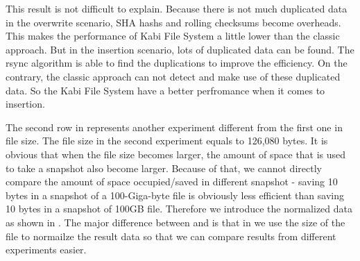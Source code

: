     This result is not difficult to explain. Because there is not much duplicated data in the overwrite scenario, SHA hashs and rolling checksums become overheads. This makes the performance of Kabi File System a little lower than the classic approach. But in the insertion scenario, lots of duplicated data can be found. The rsync algorithm is able to find the duplications to improve the efficiency. On the contrary, the classic approach can not detect and make use of these duplicated data. So the Kabi File System have a better perfromance when it comes to insertion.
    
    The second row in  represents another experiment different from the first one in file size. The file size in the second experiment equals to 126,080 bytes. It is obvious that when the file size becomes larger, the amount of space that is used to take a snapshot also become larger. Because of that, we cannot directly compare the amount of space occupied/saved in different snapshot - saving 10 bytes in a snapshot of a 100-Giga-byte file is obviously less efficient than saving 10 bytes in a snapshot of 100GB file. Therefore we introduce the normalized data as shown in . The major difference between  and  is that in  we use the size of the file to normailze the result data so that we can compare results from different experiments easier.

